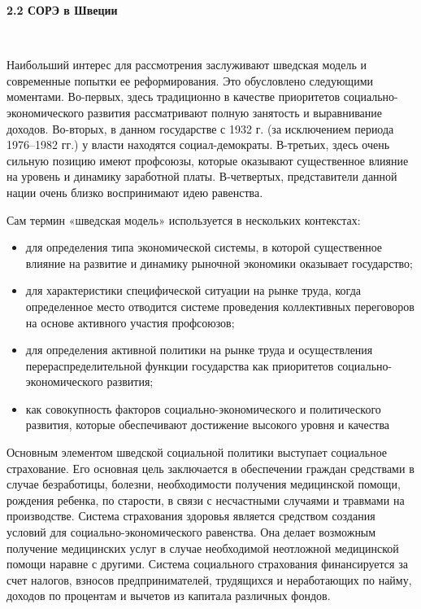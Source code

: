 \documentclass[14pt,a4paper]{article}
\begin{document}
    \begin{center}
        \textbf{2.2 СОРЭ в Швеции}
    \end{center}
    \\
    \par
    Наибольший интерес для рассмотрения заслуживают шведская модель и современные попытки ее реформирования.
    Это обусловлено следующими моментами.
    Во-первых, здесь традиционно в качестве приоритетов социально-экономического развития рассматривают полную занятость и выравнивание доходов.
    Во-вторых, в данном государстве с 1932 г. (за исключением периода 1976–1982 гг.) у власти находятся социал-демократы.
    В-третьих, здесь очень сильную позицию имеют профсоюзы, которые оказывают существенное влияние на уровень и динамику заработной платы.
    В-четвертых, представители данной нации очень близко воспринимают идею равенства.
    \par
    Сам термин «шведская модель» используется в нескольких контекстах:
    \begin{itemize}
        \item для определения типа экономической системы, в которой существенное влияние на развитие и динамику рыночной экономики оказывает государство;
        \item для характеристики специфической ситуации на рынке труда, когда определенное место отводится системе проведения коллективных переговоров на основе активного участия профсоюзов;
        \item для определения активной политики на рынке труда и осуществления перераспределительной функции государства как приоритетов социально-экономического развития;
        \item как совокупность факторов социально-экономического и политического развития, которые обеспечивают достижение высокого уровня и качества
    \end{itemize}
    \par
    Основным элементом шведской социальной политики выступает социальное страхование.
    Его основная цель заключается в обеспечении граждан средствами в случае безработицы, болезни, необходимости получения медицинской помощи, рождения ребенка, по старости, в связи с несчастными случаями и травмами на производстве.
    Система страхования здоровья является средством создания условий для социально-экономического равенства.
    Она делает возможным получение медицинских услуг в случае необходимой неотложной медицинской помощи наравне с другими.
    Система социального страхования финансируется за счет налогов, взносов предпринимателей, трудящихся и неработающих по найму, доходов по процентам и вычетов из капитала различных фондов.
\end{document}
